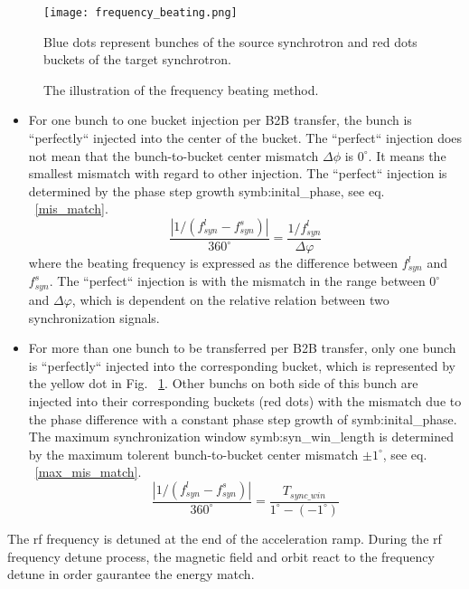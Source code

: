 \begin{figure}[!htb]
   \centering   
   \texttt{[image: frequency\_beating.png]}
   \caption{The illustration of the frequency beating method.}{Blue dots represent bunches of the source synchrotron and red dots buckets of the target synchrotron.}
   \label{frequency_beat}
\end{figure}
\begin{itemize}
\item
For one bunch to one bucket injection per B2B transfer, the bunch is ``perfectly`` injected into the center of the bucket. The ``perfect`` injection does not mean that the bunch-to-bucket center mismatch $\Delta \phi$ is $0^\circ$. It means the smallest mismatch with regard to other injection. The ``perfect`` injection is determined by the phase step growth \gls{symb:inital_phase}, see eq. ~\ref{mis_match}.
\begin{equation}
\frac{|1/(f_{\mathit{syn}}^l-f_{\mathit{syn}}^s)|}{360^\circ} = \frac{1/f_{\mathit{syn}}^l}{\Delta \varphi}\label{mis_match}
\end{equation}
where the beating frequency is expressed as the difference between $f_{\mathit{syn}}^l$ and $f_{\mathit{syn}}^s$. The ``perfect`` injection is with the mismatch in the range between $0^\circ$ and $\Delta \varphi$, which is dependent on the relative relation between two synchronization signals.

\item 
For more than one bunch to be transferred per B2B transfer, only one bunch is ``perfectly`` injected into the corresponding bucket, which is represented by the yellow dot in Fig. ~\ref{frequency_beat}. Other bunchs on both side of this bunch are injected into their corresponding buckets (red dots) with the mismatch due to the phase difference with a constant phase step growth of \gls{symb:inital_phase}. The maximum synchronization window \gls{symb:syn_win_length} is determined by the maximum tolerent bunch-to-bucket center mismatch $\pm 1^\circ$, see eq. ~\ref{max_mis_match}.
\begin{equation}
\frac{|1/(f_{\mathit{syn}}^l-f_{\mathit{syn}}^s)|}{360^\circ} = \frac{T_{\mathit{sync\_win}}}{1^\circ-(-1^\circ)}\label{max_mis_match}
\end{equation}

\end{itemize}

The rf frequency is detuned at the end of the acceleration ramp. During the rf frequency detune process, the magnetic field and orbit react to the frequency detune in order gaurantee the energy match.

